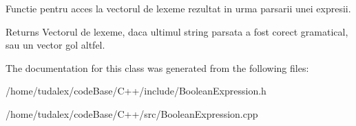Functie pentru acces la vectorul de lexeme rezultat in urma parsarii unei expresii. 

\begin{DoxyReturn}{Returns}
Vectorul de lexeme, daca ultimul string parsata a fost corect gramatical, sau un vector gol altfel. 
\end{DoxyReturn}


The documentation for this class was generated from the following files:\begin{DoxyCompactItemize}
\item 
/home/tudalex/codeBase/C++/include/BooleanExpression.h\item 
/home/tudalex/codeBase/C++/src/BooleanExpression.cpp\end{DoxyCompactItemize}
